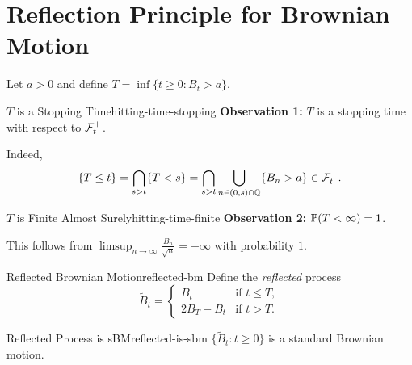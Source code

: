 
\section{Reflection Principle for Brownian Motion}

Let $a > 0$ and define $T = \inf\{t \geq 0 : B_t > a\}$.

\begin{remark}{$T$ is a Stopping Time}{hitting-time-stopping}
    \textbf{Observation 1:} $T$ is a stopping time with respect to $\mathcal{F}_t^+$.

    Indeed,
    \[
        \{T \leq t\} = \bigcap_{s > t} \{T < s\} = \bigcap_{s > t} \bigcup_{\substack{n \in (0,s) \cap \mathbb{Q}}} \{B_n > a\} \in \mathcal{F}_t^+.
    \]
\end{remark}

\begin{remark}{$T$ is Finite Almost Surely}{hitting-time-finite}
    \textbf{Observation 2:} $\mathbb{P}(T < \infty) = 1$.

    This follows from $\limsup_{n \to \infty} \frac{B_n}{\sqrt{n}} = +\infty$ with probability $1$.
\end{remark}

\begin{definition}{Reflected Brownian Motion}{reflected-bm}
    Define the \emph{reflected} process
    \[
        \tilde{B}_t =
        \begin{cases}
            B_t & \text{if } t \leq T, \\
            2B_T - B_t & \text{if } t > T.
        \end{cases}
    \]
\end{definition}

\begin{lemma}{Reflected Process is sBM}{reflected-is-sbm}
    $\{\tilde{B}_t : t \geq 0\}$ is a standard Brownian motion.
\end{lemma}

